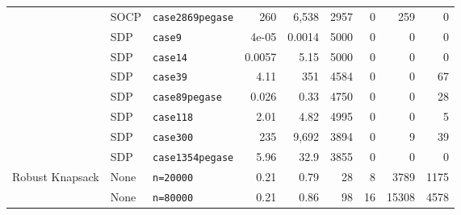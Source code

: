 \documentclass[10pt]{article} %
\theoremstyle{plain}
\theoremstyle{definition}
\theoremstyle{remark}
\begin{document}
\begin{table}[t]
\begin{tabular}{lll rr rrrr}
   & SOCP & \texttt{case2869pegase} & 260 & 6,538 & 2957 & 0 & 259 & 0 \\
   & SDP & \texttt{case9} & 4e-05 & 0.0014 & 5000 & 0 & 0 & 0 \\
   & SDP & \texttt{case14} & 0.0057 & 5.15 & 5000 & 0 & 0 & 0 \\
   & SDP & \texttt{case39} & 4.11 & 351 & 4584 & 0 & 0 & 67 \\
   & SDP & \texttt{case89pegase} & 0.026 & 0.33 & 4750 & 0 & 0 & 28 \\
   & SDP & \texttt{case118} & 2.01 & 4.82 & 4995 & 0 & 0 & 5 \\
   & SDP & \texttt{case300} & 235 & 9,692 & 3894 & 0 & 9 & 39 \\
   & SDP & \texttt{case1354pegase} & 5.96 & 32.9 & 3855 & 0 & 0 & 0 \\
\midrule
  \multirow{2}{*}{Robust Knapsack} & None & \texttt{n=20000} & 0.21 & 0.79 & 28 & 8 & 3789 & 1175 \\
   & None & \texttt{n=80000} & 0.21 & 0.86 & 98 & 16 & 15308 & 4578 \\
\bottomrule
\end{tabular}
\end{table}
\end{document}

